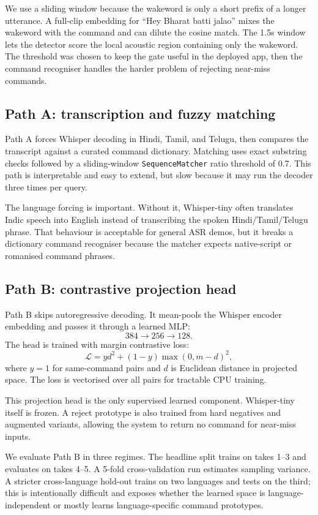 \documentclass[11pt]{article}
\begin{document}
We use a sliding window because the wakeword is only a short prefix of a
longer utterance. A full-clip embedding for ``Hey Bharat batti jalao'' mixes
the wakeword with the command and can dilute the cosine match. The 1.5s window
lets the detector score the local acoustic region containing only the wakeword.
The threshold was chosen to keep the gate useful in the deployed app, then the
command recogniser handles the harder problem of rejecting near-miss commands.

\subsection{Path A: transcription and fuzzy matching}

Path A forces Whisper decoding in Hindi, Tamil, and Telugu, then compares the
transcript against a curated command dictionary. Matching uses exact substring
checks followed by a sliding-window \texttt{SequenceMatcher} ratio threshold
of 0.7. This path is interpretable and easy to extend, but slow because it may
run the decoder three times per query.

The language forcing is important. Without it, Whisper-tiny often translates
Indic speech into English instead of transcribing the spoken Hindi/Tamil/Telugu
phrase. That behaviour is acceptable for general ASR demos, but it breaks a
dictionary command recogniser because the matcher expects native-script or
romanised command phrases.

\subsection{Path B: contrastive projection head}

Path B skips autoregressive decoding. It mean-pools the Whisper encoder
embedding and passes it through a learned MLP:
\[
384 \rightarrow 256 \rightarrow 128.
\]
The head is trained with margin contrastive loss:
\[
\mathcal{L} = y d^2 + (1-y)\max(0, m-d)^2,
\]
where $y=1$ for same-command pairs and $d$ is Euclidean distance in projected
space. The loss is vectorised over all pairs for tractable CPU training.

This projection head is the only supervised learned component. Whisper-tiny
itself is frozen. A reject prototype is also trained from hard negatives and
augmented variants, allowing the system to return no command for near-miss
inputs.

We evaluate Path B in three regimes. The headline split trains on takes 1--3
and evaluates on takes 4--5. A 5-fold cross-validation run estimates sampling
variance. A stricter cross-language hold-out trains on two languages and tests
on the third; this is intentionally difficult and exposes whether the learned
space is language-independent or mostly learns language-specific command
prototypes.
\end{document}
